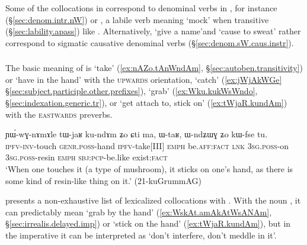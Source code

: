Some of the collocations in  correspond to denominal verbs in , for instance  (§\ref{sec:denom.intr.nW}) or , a labile verb meaning `mock' when transitive (§\ref{sec:lability.apass}) like . Alternatively,  `give a name'and  `cause to sweat' rather correspond to sigmatic causative denominal verbs (§\ref{sec:denom.sW.caus.instr}).


\subsubsection{ } \label{sec:ndo.lv}
The basic meaning of  is `take' (\ref{ex:nAZo.tAnWndAm}, §\ref{sec:autoben.transitivity}) or `have in the hand' with the \textsc{upwards} orientation, `catch' (\ref{ex:jWjAkWGe} §\ref{sec:subject.participle.other.prefixes}), `grab' (\ref{ex:Wku.kukWsWndo}, §\ref{sec:indexation.generic.tr}), or  `get attach to, stick on' (\ref{ex:tWjaR.kundAm}) with the \textsc{eastwards} preverbs.  
  
\begin{exe}
\ex \label{ex:tWjaR.kundAm}
\gll ɲɯ́-wɣ-nɤmɤle tɯ-jaʁ ku-ndɤm ʑo ɕti ma, ɯ-taʁ, ɯ-ndʑɯɣ ʑo kɯ-fse tu. \\
\textsc{ipfv}-\textsc{inv}-touch \textsc{genr}.\textsc{poss}-hand \textsc{ipfv}-take[III] \textsc{emph} be.\textsc{aff}:\textsc{fact} \textsc{lnk} \textsc{3sg}.\textsc{poss}-on \textsc{3sg}.\textsc{poss}-resin \textsc{emph} \textsc{sbj}:\textsc{pcp}-be.like exist:\textsc{fact} \\
\glt `When one touches it (a type of mushroom), it sticks on one's hand, as there is some kind of resin-like thing on it.' (21-kuGrummAG)
\end{exe}

 presents a non-exhaustive list of lexicalized collocations with . With the noun , it can predictably mean `grab by the hand' (\ref{ex:WskAt.amAkAtWsANAm}, §\ref{sec:irrealis.delayed.imp}) or `stick on the hand' (\ref{ex:tWjaR.kundAm}), but in the imperative it can be interpreted as `don't interfere, don't meddle in it'.

